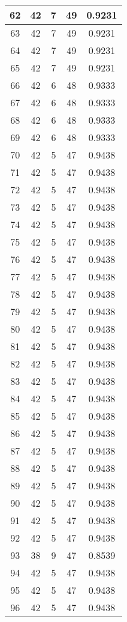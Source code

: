 \documentclass[letterpaper, 12pt]{article}
\begin{document}
\begin{longtable}{|c|c|c|c|c|}
\hline
62 & 42 & 7 & 49 & 0.9231 \\
\hline
63 & 42 & 7 & 49 & 0.9231 \\
\hline
64 & 42 & 7 & 49 & 0.9231 \\
\hline
65 & 42 & 7 & 49 & 0.9231 \\
\hline
66 & 42 & 6 & 48 & 0.9333 \\
\hline
67 & 42 & 6 & 48 & 0.9333 \\
\hline
68 & 42 & 6 & 48 & 0.9333 \\
\hline
69 & 42 & 6 & 48 & 0.9333 \\
\hline
70 & 42 & 5 & 47 & 0.9438 \\
\hline
71 & 42 & 5 & 47 & 0.9438 \\
\hline
72 & 42 & 5 & 47 & 0.9438 \\
\hline
73 & 42 & 5 & 47 & 0.9438 \\
\hline
74 & 42 & 5 & 47 & 0.9438 \\
\hline
75 & 42 & 5 & 47 & 0.9438 \\
\hline
76 & 42 & 5 & 47 & 0.9438 \\
\hline
77 & 42 & 5 & 47 & 0.9438 \\
\hline
78 & 42 & 5 & 47 & 0.9438 \\
\hline
79 & 42 & 5 & 47 & 0.9438 \\
\hline
80 & 42 & 5 & 47 & 0.9438 \\
\hline
81 & 42 & 5 & 47 & 0.9438 \\
\hline
82 & 42 & 5 & 47 & 0.9438 \\
\hline
83 & 42 & 5 & 47 & 0.9438 \\
\hline
84 & 42 & 5 & 47 & 0.9438 \\
\hline
85 & 42 & 5 & 47 & 0.9438 \\
\hline
86 & 42 & 5 & 47 & 0.9438 \\
\hline
87 & 42 & 5 & 47 & 0.9438 \\
\hline
88 & 42 & 5 & 47 & 0.9438 \\
\hline
89 & 42 & 5 & 47 & 0.9438 \\
\hline
90 & 42 & 5 & 47 & 0.9438 \\
\hline
91 & 42 & 5 & 47 & 0.9438 \\
\hline
92 & 42 & 5 & 47 & 0.9438 \\
\hline
93 & 38 & 9 & 47 & 0.8539 \\
\hline
94 & 42 & 5 & 47 & 0.9438 \\
\hline
95 & 42 & 5 & 47 & 0.9438 \\
\hline
96 & 42 & 5 & 47 & 0.9438 \\

\end{longtable}
\end{document}
